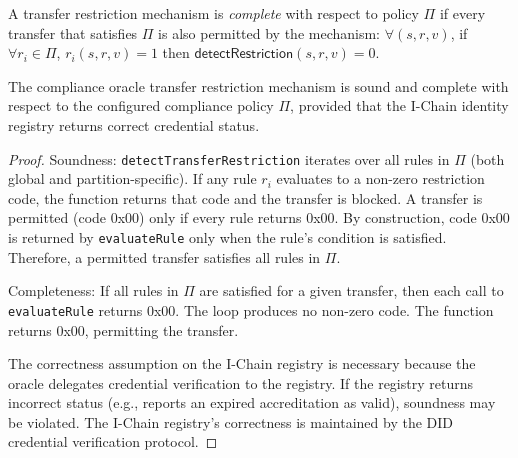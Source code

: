 \begin{definition}
A transfer restriction mechanism is \emph{complete} with respect to policy $\Pi$ if every transfer that satisfies $\Pi$ is also permitted by the mechanism: $\forall (s, r, v)$, if $\forall r_i \in \Pi$, $r_i(s, r, v) = 1$ then $\textsf{detectRestriction}(s, r, v) = 0$.
\end{definition}

\begin{theorem}
The compliance oracle transfer restriction mechanism is sound and complete with respect to the configured compliance policy $\Pi$, provided that the I-Chain identity registry returns correct credential status.
\end{theorem}

\begin{proof}
Soundness: \texttt{detectTransferRestriction} iterates over all rules in $\Pi$ (both global and partition-specific). If any rule $r_i$ evaluates to a non-zero restriction code, the function returns that code and the transfer is blocked. A transfer is permitted (code 0x00) only if every rule returns 0x00. By construction, code 0x00 is returned by \texttt{evaluateRule} only when the rule's condition is satisfied. Therefore, a permitted transfer satisfies all rules in $\Pi$.

Completeness: If all rules in $\Pi$ are satisfied for a given transfer, then each call to \texttt{evaluateRule} returns 0x00. The loop produces no non-zero code. The function returns 0x00, permitting the transfer.

The correctness assumption on the I-Chain registry is necessary because the oracle delegates credential verification to the registry. If the registry returns incorrect status (e.g., reports an expired accreditation as valid), soundness may be violated. The I-Chain registry's correctness is maintained by the DID credential verification protocol.
\end{proof}

